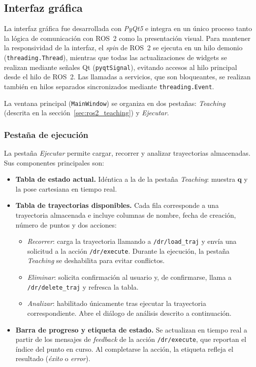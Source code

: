 \documentclass{article}
\begin{document}
\subsection{Interfaz gráfica}
\label{sec:ros2_gui}

La interfaz gráfica fue desarrollada con \textit{PyQt5} e integra en un único proceso tanto la lógica de comunicación con ROS~2 como la presentación visual. Para mantener la responsividad de la interfaz, el \textit{spin} de ROS~2 se ejecuta en un hilo demonio (\texttt{threading.Thread}), mientras que todas las actualizaciones de widgets se realizan mediante señales Qt (\texttt{pyqtSignal}), evitando accesos al hilo principal desde el hilo de ROS~2. Las llamadas a servicios, que son bloqueantes, se realizan también en hilos separados sincronizados mediante \texttt{threading.Event}.

La ventana principal (\texttt{MainWindow}) se organiza en dos pestañas: \textit{Teaching} (descrita en la sección~\ref{sec:ros2_teaching}) y \textit{Ejecutar}.

\subsubsection*{Pestaña de ejecución}

La pestaña \textit{Ejecutar} permite cargar, recorrer y analizar trayectorias almacenadas. Sus componentes principales son:

\begin{itemize}
    \item \textbf{Tabla de estado actual.} Idéntica a la de la pestaña \textit{Teaching}: muestra $\mathbf{q}$ y la pose cartesiana en tiempo real.

    \item \textbf{Tabla de trayectorias disponibles.} Cada fila corresponde a una trayectoria almacenada e incluye columnas de nombre, fecha de creación, número de puntos y dos acciones:
        \begin{itemize}
            \item \textit{Recorrer}: carga la trayectoria llamando a \texttt{/dr/load\_traj} y envía una solicitud a la acción \texttt{/dr/execute}. Durante la ejecución, la pestaña \textit{Teaching} se deshabilita para evitar conflictos.
            \item \textit{Eliminar}: solicita confirmación al usuario y, de confirmarse, llama a \texttt{/dr/delete\_traj} y refresca la tabla.
            \item \textit{Analizar}: habilitado únicamente tras ejecutar la trayectoria correspondiente. Abre el diálogo de análisis descrito a continuación.
        \end{itemize}

    \item \textbf{Barra de progreso y etiqueta de estado.} Se actualizan en tiempo real a partir de los mensajes de \textit{feedback} de la acción \texttt{/dr/execute}, que reportan el índice del punto en curso. Al completarse la acción, la etiqueta refleja el resultado (\textit{éxito} o \textit{error}).
\end{itemize}
\end{document}
